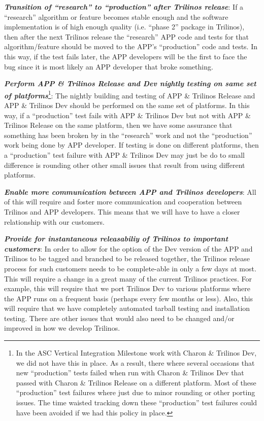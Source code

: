 \documentclass[pdf,ps2pdf,11pt]{SANDreport}
\begin{document}
{}\textit{\textbf{Transition of ``research'' to ``production'' after Trilinos
release}}: If a ``research'' algorithm or feature becomes stable enough and
the software implementation is of high enough quality (i.e. ``phase 2''
package in Trilinos), then after the next Trilinos release the ``research''
APP code and tests for that algorithm/feature should be moved to the APP's
``production'' code and tests.  In this way, if the test fails later, the APP
developers will be the first to face the bug since it is most likely an APP
developer that broke something.

{}\textit{\textbf{Perform APP \& Trilinos Release and Dev nightly testing on
same set of platforms}}\footnote{In the ASC Vertical Integration Milestone
work with Charon \& Trilinos Dev, we did not have this in place.  As a result,
there where several occasions that new ``production'' tests failed when run
with Charon \& Trilinos Dev that passed with Charon \& Trilinos Release on a
different platform.  Most of these ``production'' test failures where just due
to minor rounding or other porting issues.  The time waisted tracking down
these ``production'' test failures could have been avoided if we had this
policy in place.}: The nightly building and testing of APP \& Trilinos Release
and APP \& Trilinos Dev should be performed on the same set of platforms.  In
this way, if a ``production'' test fails with APP \& Trilinos Dev but not with
APP \& Trilinos Release on the same platform, then we have some assurance that
something has been broken by in the ``research'' work and not the
``production'' work being done by APP developer.  If testing is done on
different platforms, then a ``production'' test failure with APP \& Trilinos
Dev may just be do to small difference is rounding other other small issues
that result from using different platforms.

{}\textit{\textbf{Enable more communication between APP and Trilinos developers}}:
All of this will require and foster more communication and cooperation between
Trilinos and APP developers.  This means that we will have to have a closer
relationship with our customers.

{}\textit{\textbf{Provide for instantaneous releasabiliy of Trilinos to important
customers}}: In order to allow for the option of the Dev version of the APP and
Trilinos to be tagged and branched to be released together, the Trilinos
release process for such customers needs to be complete-able in only a few days
at most.  This will require a change in a great many of the current Trilinos
practices.  For example, this will require that we port Trilinos Dev to
various platforms where the APP runs on a frequent basis (perhaps every few
months or less).  Also, this will require that we have completely automated
tarball testing and installation testing.  There are other issues that would
also need to be changed and/or improved in how we develop Trilinos.
\end{document}
